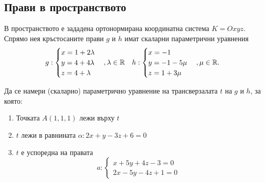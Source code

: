 \documentclass[numbers=endperiod, DIV=15, bibliography=totocnumbered]{scrartcl}
\begin{document}
\subsection{Прави в пространството}

\begin{exercise}
  В пространството е зададена ортонормирана координатна система $K = Oxyz$. Спрямо нея кръстосаните прави $g$ и $h$ имат скаларни параметрични уравнения
  \begin{align*}
    g: \begin{cases}
      x = 1 + 2\lambda \\
      y = 4 + 4\lambda \\
      z = 4 + \lambda
    \end{cases},
    \lambda \in \mathbb{R}
    &&
    h: \begin{cases}
      x = -1 \\
      y = -1 - 5\mu \\
      z = 1 + 3\mu
    \end{cases},
    \mu \in \mathbb{R}.
  \end{align*}

  Да се намери (скаларно) параметрично уравнение на трансверзалата $t$ на $g$ и $h$, за която:
  \begin{enumerate}[label=\alph*)]
    \item Точката $A(1, 1, 1)$ лежи върху $t$
    \item $t$ лежи в равнината $\alpha: 2x + y - 3z + 6 = 0$
    \item $t$ е успоредна на правата
    \begin{displaymath}
      a: \begin{cases}
        x + 5y + 4z - 3 = 0 \\
        2x - 5y - 4z + 1 = 0
      \end{cases}
    \end{displaymath}
  \end{enumerate}
\end{exercise}
\end{document}

